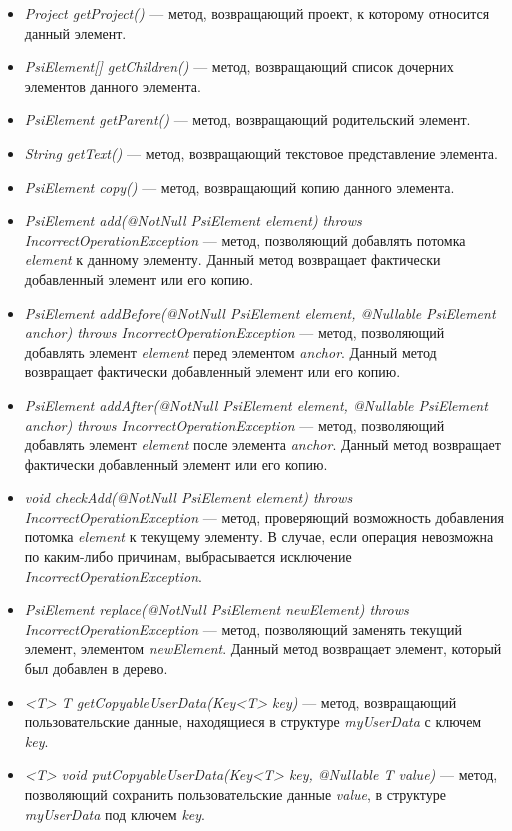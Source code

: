 \begin{itemize}
	\item \textit{Project getProject()} --- метод, возвращающий проект, к
		которому относится данный элемент.
	\item \textit{PsiElement[] getChildren()} --- метод, возвращающий список
		дочерних элементов данного элемента.
	\item \textit{PsiElement getParent()} --- метод, возвращающий родительский
		элемент.
	\item \textit{String getText()} --- метод, возвращающий текстовое
		представление элемента.
	\item \textit{PsiElement copy()} --- метод, возвращающий копию данного
		элемента.
	\item \textit{PsiElement add(@NotNull PsiElement element) throws
		IncorrectOperationException} --- метод, позволяющий добавлять потомка
		\textit{element} к данному элементу.
		Данный метод возвращает фактически добавленный элемент или его копию.
	\item \textit{PsiElement addBefore(@NotNull PsiElement element, @Nullable
		PsiElement anchor) throws IncorrectOperationException} --- метод,
		позволяющий добавлять элемент \textit{element} перед элементом
		\textit{anchor}.
		Данный метод возвращает фактически добавленный элемент или его копию.
	\item \textit{PsiElement addAfter(@NotNull PsiElement element, @Nullable
		PsiElement anchor) throws IncorrectOperationException} --- метод,
		позволяющий добавлять элемент \textit{element} после элемента
		\textit{anchor}.
		Данный метод возвращает фактически добавленный элемент или его копию.
	\item \textit{void checkAdd(@NotNull PsiElement element) throws
		IncorrectOperationException} --- метод, проверяющий возможность
		добавления потомка \textit{element} к текущему элементу.
		В случае, если операция невозможна по каким-либо причинам, выбрасывается
		исключение \textit{IncorrectOperationException}.
	\item \textit{PsiElement replace(@NotNull PsiElement newElement) throws
		IncorrectOperationException} --- метод, позволяющий заменять текущий
		элемент, элементом \textit{newElement}.
		Данный метод возвращает элемент, который был добавлен в дерево.
	\item \textit{<T> T getCopyableUserData(Key<T> key)} --- метод, возвращающий
		пользовательские данные, находящиеся в структуре \textit{myUserData}
		с ключем \textit{key}.
	\item \textit{<T> void putCopyableUserData(Key<T> key, @Nullable T value)}
		--- метод, позволяющий сохранить пользовательские данные
		\textit{value}, в структуре \textit{myUserData} под ключем \textit{key}.
\end{itemize}
